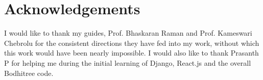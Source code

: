 \documentclass[12pt]{article}
\begin{document}

\newpage

\newpage

\newpage

\newpage

\newpage
%
\section*{Acknowledgements}
I would like to thank my guides, Prof. Bhaskaran Raman and Prof. Kameswari Chebrolu for the consistent directions they have fed
into my work, without which this work would have been nearly impossible. I would also like to thank Prasanth P for helping me during the initial learning of Django, React.js and the overall Bodhitree code.
\newpage
%

%
%
\end{document}
